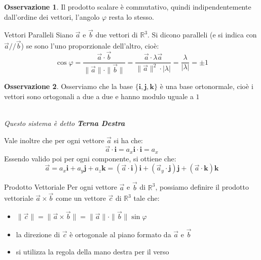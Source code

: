\documentclass[11pt,a4paper,twoside]{article}
\theoremstyle{definition}
\newtheorem*{oss}{Osservazione}
\begin{document}
\begin{oss}
	Il prodotto scalare è commutativo, quindi indipendentemente dall'ordine dei vettori, l'angolo $\varphi$ resta lo stesso.
\end{oss}

\begin{defn}{Vettori Paralleli}{}
	Siano $\vec a$ e $\vec b$ due vettori di $\mathbb R^3$. Si dicono paralleli (e si indica con $\vec a /\!/ \vec b$) se sono l'uno proporzionale dell'altro, cioè:
	\[
		\cos \varphi = \frac{\vec a \cdot \vec b}{\|\vec a\| \cdot \| \vec b\|} = \frac{\vec a \cdot \lambda \vec a}{\|\vec a\|^2\cdot |\lambda|} = \frac \lambda {|\lambda|} = \pm 1
	\]
\end{defn}

\begin{oss}
	Osserviamo che la base $\{\mathbf i, \mathbf j, \mathbf k\}$ è una base ortonormale, cioè i vettori sono ortogonali a due a due e hanno modulo uguale a $1$
\end{oss}

\begin{center}
	\\
	\textit{Questo sistema è detto \textbf{Terna Destra}}
\end{center}

Vale inoltre che per ogni vettore $\vec a$ si ha che:
\[ \vec a \cdot \mathbf i = a_x \mathbf i \cdot \mathbf i = a_x \]
Essendo valido poi per ogni componente, si ottiene che:
\[
	\vec a = a_x \mathbf i + a_y \mathbf j + a_z \mathbf k = (\vec a \cdot \mathbf i)\mathbf i + (\vec a_y \cdot \mathbf j)\mathbf j + (\vec a \cdot \mathbf k)\mathbf k
\]

\begin{defn}{Prodotto Vettoriale}{}
	Per ogni vettore $\vec a$ e $\vec b$ di $\mathbb R^3$, possiamo definire il prodotto vettoriale $\vec a \times \vec b$ come un vettore $\vec c$ di $\mathbb R^3$ tale che:
	\begin{itemize}
		\item $\|\vec c\| = \|\vec a \times \vec b\| = \|\vec a\| \cdot \|\vec b\| \sin \varphi$
		\item la direzione di $\vec c$ è ortogonale al piano formato da $\vec a$ e $\vec b$
		\item si utilizza la regola della mano destra per il verso
	\end{itemize}
\end{defn}
\end{document}
